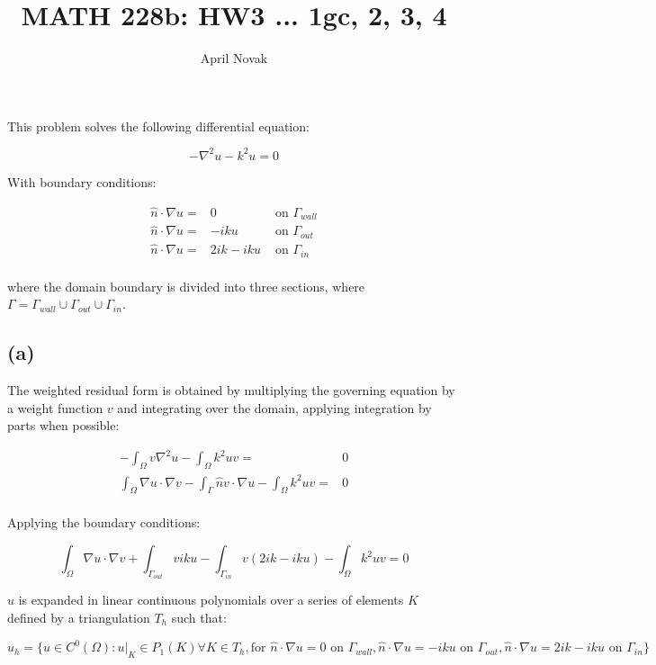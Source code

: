 \documentclass[10pt]{article}
\newcommand{\beq}{\begin{equation}}
\newcommand{\eeq}{\end{equation}}
\newcommand{\beqa}{\begin{equation}\begin{aligned}}
\newcommand{\eeqa}{\end{aligned}\end{equation}}
\begin{document}
\title{MATH 228b: HW3 ... 1gc, 2, 3, 4}
\author{April Novak}

\maketitle

\section{}

This problem solves the following differential equation:

\beq
-\nabla^2 u-k^2u=0
\eeq

With boundary conditions:

\beqa
\label{eq:BCs}
\hat{n}\cdot\nabla u=&0 & \textrm{ on } \Gamma_{wall}\\
\hat{n}\cdot\nabla u=&-iku & \textrm{ on } \Gamma_{out}\\
\hat{n}\cdot\nabla u=&2ik-iku & \textrm{ on } \Gamma_{in}\\
\eeqa

where the domain boundary is divided into three sections, where \(\Gamma=\Gamma_{wall}\cup\Gamma_{out}\cup\Gamma_{in}\). 

\subsection{(a)}

The weighted residual form is obtained by multiplying the governing equation by a weight function \(v\) and integrating over the domain, applying integration by parts when possible:

\beqa
-\int_{\Omega}v\nabla^2 u-\int_{\Omega}k^2uv=& 0\\
\int_{\Omega}\nabla u\cdot\nabla v-\int_{\Gamma}\hat{n}v\cdot\nabla u-\int_{\Omega}k^2uv=&0\\
\eeqa

Applying the boundary conditions:

\beq
\int_{\Omega}\nabla u\cdot\nabla v+\int_{\Gamma_{out}}viku-\int_{\Gamma_{in}}v(2ik-iku)-\int_{\Omega}k^2uv=0
\eeq

\(u\) is expanded in linear continuous polynomials over a series of elements \(K\) defined by a triangulation \(T_h\) such that:

\beq
u_h=\{u\in C^0(\Omega):u\rvert_K\in P_1(K)\forall K\in T_h, \textrm{for } \hat{n}\cdot\nabla u=0 \textrm{ on } \Gamma_{wall}, \hat{n}\cdot\nabla u=-iku \textrm{ on } \Gamma_{out}, \hat{n}\cdot\nabla u=2ik-iku \textrm{ on } \Gamma_{in}\}
\eeq
\end{document}
